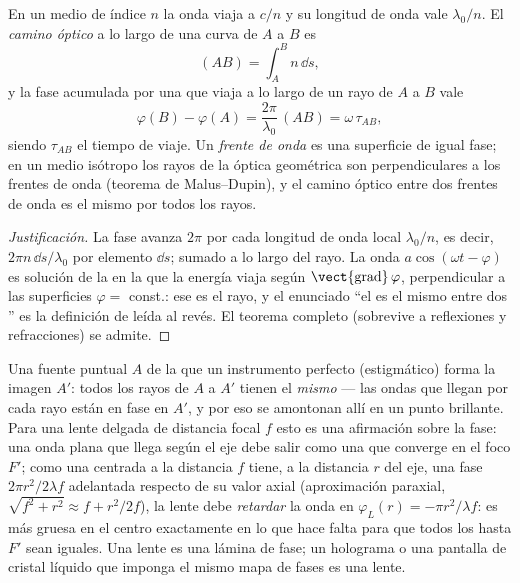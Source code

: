 \begin{definition}\label{def:b2:scalar-light-model:path}
En un medio de índice $n$ la onda viaja a $c/n$ y su longitud de onda
vale $\lambda_0/n$. El \emph{camino óptico} a lo largo de una curva de $A$ a $B$ es
\[
(AB) = \int_A^Bn\,\dd s ,
\]
y la fase acumulada por una  que viaja a lo largo de un
rayo de $A$ a $B$ vale
\[
\varphi(B) - \varphi(A) = \frac{2\pi}{\lambda_0}\,(AB) = \omega\,\tau_{AB} ,
\]
siendo $\tau_{AB}$ el tiempo de viaje. Un \emph{frente de onda} es una superficie de
igual fase; en un medio isótropo los rayos de la óptica geométrica son
perpendiculares a los frentes de onda (teorema de Malus--Dupin), y el camino
óptico entre dos frentes de onda es el mismo por todos los rayos.
\end{definition}

\begin{proof}[Justificación]
La fase avanza $2\pi$ por cada longitud de onda local $\lambda_0/n$, es decir,
$2\pi n\,\dd s/\lambda_0$ por elemento $\dd s$; sumado a lo largo del rayo. La onda
$a\cos(\omega t - \varphi)$ es solución de la  en la que la
energía viaja según $\operatorname{\vect{grad}}\varphi$, perpendicular a las
superficies $\varphi = $ const.: ese es el rayo, y el enunciado ``el  es el mismo
entre dos '' es la definición de 
leída al revés. El teorema completo (sobrevive a reflexiones y
refracciones) se admite.
\end{proof}

\begin{example}\label{ex:b2:scalar-light-model:lens}
Una fuente puntual $A$ de la que un instrumento perfecto (estigmático) forma la imagen $A'$:
todos los rayos de $A$ a $A'$ tienen el \emph{mismo } --- las
ondas que llegan por cada rayo están en fase en $A'$, y por eso se
amontonan allí en un punto brillante. Para una lente delgada de distancia focal $f$
esto es una afirmación sobre la fase: una onda plana que llega según el eje
debe salir como una  que converge en el foco $F'$; como una
 centrada a la distancia $f$ tiene, a la distancia $r$ del eje,
una fase $2\pi r^2/2\lambda f$ adelantada respecto de su valor axial (aproximación
paraxial, $\sqrt{f^2 + r^2} \approx f + r^2/2f$), la lente debe
\emph{retardar} la onda en $\varphi_L(r) = -\pi r^2/\lambda f$: es más gruesa en
el centro exactamente en lo que hace falta para que todos los  hasta $F'$
sean iguales. Una lente es una lámina de fase; un holograma o una pantalla
de cristal líquido que imponga el mismo mapa de fases es una lente.
\end{example}

